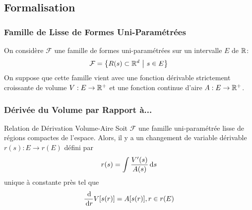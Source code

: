 \documentclass{../beamercours}
\begin{document}
\subsection{Formalisation}
\begin{frame}
    \frametitle{Famille de Lisse de Formes Uni-Paramétrées}
    On considère $\mathcal{F}$ une famille de formes uni-paramétrées sur un intervalle $E$ de $\mathbb{R}$: 
    \begin{equation*}
        \mathcal{F} = \left\{R(s) \subset \R^{d}\ \middle|\ s \in E\right\}
    \end{equation*}
    On suppose que cette famille vient avec une fonction dérivable strictement croissante de volume $V: E \to \mathbb{R}^{+}$ et une fonction continue d'aire $A: E \to \mathbb{R}^{+}$.\\
    \visible<2>{
        Par exemple, pour les carrés de côté $> 0$, $\mathcal{C} =\left\{[0, c] \times [0, c] \subset \R^{2}\ \middle|\ s \in [0, +\infty[\right\}$, $V : s\mapsto s^{2}$ et $A : s \mapsto 6s$.
    }
\end{frame}

\begin{frame}
    \frametitle{Dérivée du Volume par Rapport à...}
    \begin{théorème}
        {Relation de Dérivation Volume-Aire}{}
        Soit $\mathcal{F}$ une famille uni-paramétrée lisse de régions compactes de l'espace. Alors, il y a un changement de variable dérivable $r(s) : E \to r(E)$ défini par
        \vspace{-3pt}
        \begin{equation*}
            r(s) = \int \frac{V'(s)}{A(s)}{\rm \, d} s
        \end{equation*}
        \vspace{-4pt}
        unique à constante près tel que 
        \vspace{-4pt}
        \begin{equation*}
            \frac{{\rm \, d}}{{\rm \, d} r}V[s(r)] = A[s(r)], r \in r(E)
        \end{equation*}
    \end{théorème}
\end{frame}
\end{document}
